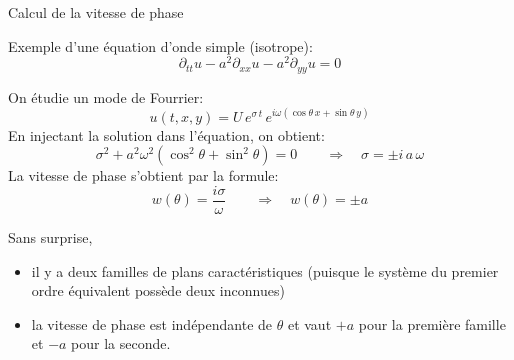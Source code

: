 \documentclass[
mode=present,    %
paper=a4paper,   %
orient=landscape,
display=slides,   %
size=10pt,
style=romain   %
]{powerdot}
\begin{document}
\begin{slide}[toc=Vitesse de phase]{Calcul de la vitesse de phase}

Exemple d'une équation d'onde simple (isotrope):
\begin{equation*}
\partial_{tt} u -a^2\partial_{xx} u -a^2\partial_{yy} u = 0
\end{equation*}

\bigskip

On étudie un mode de Fourrier:
\begin{equation*}
u(t,x,y)=U\,e^{\sigma\,t}\, e^{i\omega(\cos\theta\,x+\sin\theta\,y)}
\end{equation*}
En injectant la solution dans l'équation, on obtient:
\begin{equation*}
\sigma^2 + a^2 \omega^2 (\cos^2\theta+\sin^2\theta) = 0 \qquad \Rightarrow \quad \sigma = \pm i\,a\,\omega
\end{equation*}
La vitesse de phase s'obtient par la formule:
\begin{equation*}
w(\theta) = \frac{i\sigma}{\omega} \qquad \Rightarrow \quad \boxed{w(\theta) = \pm a }
\end{equation*}

\bigskip

Sans surprise,
\begin{itemize}
\item il y a deux familles de plans caractéristiques (puisque le système du premier ordre équivalent possède deux inconnues)
\item la vitesse de phase est indépendante de $\theta$ et vaut $+a$ pour la première famille et $-a$ pour la seconde.
\end{itemize}


\end{slide}
\end{document}
